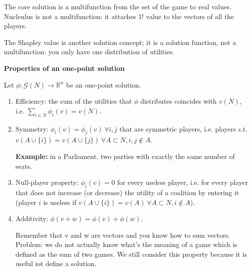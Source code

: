 
%



\noindent The core solution is a multifunction from the set of the game to 
real values. Nucleulus is not a multifunction: it attaches 1! value to the 
vectors of all the players.

\noindent The Shapley value is another solution concept; it is a solution 
function, not a multifunction: you only have one distribution of utilities.

\bigskip
\noindent \textbf{Properties of an one-point solution}

\noindent Let $\phi: \mathcal{G}(N) \rightarrow \mathbb{R}^n$ be an one-point solution.

\begin{enumerate}
	\item Efficiency: the sum of the utilities that $\phi$ distributes 
	coincides with $v(N)$, i.e. $\sum_{i \in N}\phi_i(v) = v(N)$.
	
	\item Symmetry: $\phi_i(v) = \phi_j(v) ~\forall i,j$ that are symmetric players, i.e. players s.t. $v(A \cup \{i\}) = v(A \cup \{j\}) ~\forall A \subset N, i,j \notin A$.
	
	\noindent
	\textbf{Example:} in a Parliament, two parties with exactly the same 
	number of seats.

	\item Null-player property: $\phi_i(v) = 0$ for every useless player, i.e. for every player that does not increase (or decrease) 
	the utility of a coalition by entering it (player $i$ is useless if $v(A \cup \{i\}) = v(A) ~\forall A \subset N, i \notin A$).

	\item Additivity: $\phi(v + w) = \phi(v)  + \phi(w)$.
	
	\noindent
	Remember that v and w are vectors and you know how to 
	sum vectors. Problem: we do not actually know what's the meaning of a game 
	which is defined as the sum of two games. We still consider this property 
	because it is useful iot define a solution.
\end{enumerate}

